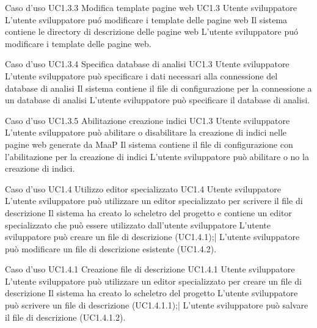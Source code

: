 \UCtitle
{Caso d'uso UC1.3.3}
{Modifica template pagine web}
\UC
{UC1.3}
{Utente sviluppatore}
{L'utente sviluppatore pu\'o modificare i template delle pagine web}
{Il sistema contiene le directory di descrizione delle pagine web}
\scenario
{L'utente sviluppatore pu\'o modificare i template delle pagine web.}

\UCtitle
{Caso d'uso UC1.3.4}
{Specifica database di analisi}
\UC
{UC1.3}
{Utente sviluppatore}
{L'utente sviluppatore può specificare i dati necessari alla connessione del database di analisi}
{Il sistema contiene il file di configurazione per la connessione a un database di analisi}
\scenario
{L'utente sviluppatore può specificare il database di analisi.}

\UCtitle
{Caso d'uso UC1.3.5}
{Abilitazione creazione indici}
\UC
{UC1.3}
{Utente sviluppatore}
{L'utente sviluppatore può abilitare o disabilitare la creazione di indici nelle pagine web generate da MaaP}
{Il sistema contiene il file di configurazione con l'abilitazione per la creazione di indici}
\scenario
{L'utente sviluppatore può abilitare o no la creazione di indici.}

\UCtitle
{Caso d'uso UC1.4}
{Utilizzo editor specializzato}
\UC
{UC1.4}
{Utente sviluppatore}
{L'utente sviluppatore può utilizzare un editor specializzato per scrivere il file di descrizione}
{Il sistema ha creato lo scheletro del progetto e contiene un editor specializzato che può essere utilizzato dall'utente sviluppatore}
\scenario
{L'utente sviluppatore può creare un file di descrizione (UC1.4.1);|
L'utente sviluppatore può modificare un file di descrizione esistente (UC1.4.2).
}

\UCtitle
{Caso d'uso UC1.4.1}
{Creazione file di descrizione}
\UC
{UC1.4.1}
{Utente sviluppatore}
{L'utente sviluppatore può utilizzare un editor specializzato per creare un file di descrizione}
{Il sistema ha creato lo scheletro del progetto}
\scenario
{L'utente sviluppatore può scrivere un file di descrizione (UC1.4.1.1);|
L'utente sviluppatore può salvare il file di descrizione (UC1.4.1.2).
}


